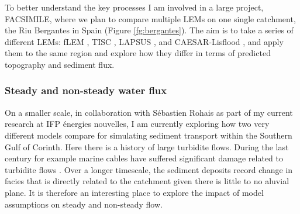 To better understand the key processes I am involved in a large project, FACSIMILE, where we plan to compare multiple LEMs on one single catchment, the Riu Bergantes in Spain (Figure \ref{fg:bergantes}). The aim is to take a series of different LEMs: fLEM \citep{armitage-2019}, TISC \citep{garcia-castellanos-2002}, LAPSUS \citep{schoorl-etal-2000}, and CAESAR-Lisflood \citep{coulthard-etal-2013}, and apply them to the same region and explore how they differ in terms of predicted topography and sediment flux.

\subsubsection*{Steady and non-steady water flux}

On a smaller scale, in collaboration with Sébastien Rohais as part of my current research at IFP énergies nouvelles, I am currently exploring how two very different models compare for simulating sediment transport within the Southern Gulf of Corinth. Here there is a history of large turbidite flows. During the last century for example marine cables have suffered significant damage related to turbidite flows \citep{heezen-etal-1966}. Over a longer timescale, the sediment deposits record change in facies that is directly related to the catchment given there is little to no aluvial plane. It is therefore an interesting place to explore the impact of model assumptions on steady and non-steady flow.

